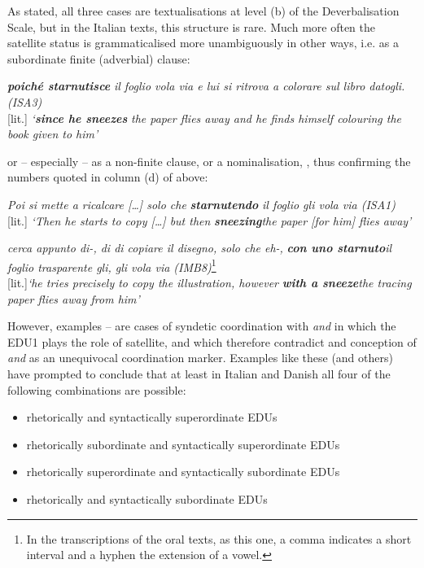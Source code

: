 \documentclass[output=paper]{LSP/langsci}
\begin{document}
As stated, all three cases are textualisations at level (b) of the Deverbalisation Scale, but in the Italian texts, this structure is rare. Much more often the satellite status is grammaticalised more unambiguously in other ways, i.e. as a subordinate finite (adverbial) clause: 

\ea\label{ex:korzen:11}
\textbf{\textit{poiché starnutisce}} \textit{il foglio vola via e lui si ritrova a colorare sul libro datogli. (ISA3)} \\
\textup{[lit.]} \textit{ `}\textbf{\textit{since he sneezes}} \textit{the paper flies away and he finds himself colouring the book given to him'}
\z

or -- especially -- as a non-finite clause,  or a nominalisation, , thus confirming the numbers quoted in column (d) of  above:

\ea\label{ex:korzen:12}
\textit{Poi si mette a ricalcare [\ldots ] solo che}
\textbf{\textit{starnutendo}} \textit{ il foglio gli vola via (ISA1)}\\
\textup{[lit.]} \textit{`Then he starts to copy [\ldots] but then }\textbf{\textit{sneezing}}\textit{the paper [for him] flies away'}
\z

\ea\label{ex:korzen:13}
\textit{cerca appunto di-, di di copiare il disegno, solo che eh-, }\textbf{\textit{con uno starnuto}}\textit{il foglio trasparente gli, gli vola via (IMB8)}\footnote{In the transcriptions of the oral texts, as this one, a comma indicates a short interval and a hyphen the extension of a vowel.}\\

[lit.]\textit{`he tries precisely to copy the illustration, however }\textbf{\textit{with a sneeze}}\textit{the tracing paper flies away from him'}
\z

However, examples -- are cases of syndetic coordination with \textit{and} in which the EDU1 plays the role of satellite, and which therefore contradict  and  conception of \textit{and} as an unequivocal coordination marker. Examples like these (and others) have prompted \citet[87]{Korzen2000} to conclude that at least in Italian and Danish all four of the following combinations are possible:

\begin{itemize}
\item 
rhetorically and syntactically superordinate EDUs
\item
rhetorically subordinate and syntactically superordinate EDUs
\item
rhetorically superordinate and syntactically subordinate EDUs
\item
rhetorically and syntactically subordinate EDUs
\end{itemize}
\end{document}
